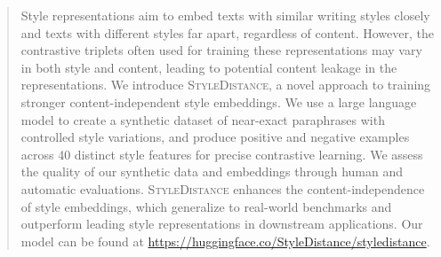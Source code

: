 \begin{abstract}
Style representations aim to embed texts with similar writing styles closely and texts with different styles far apart, regardless of content. However, the contrastive triplets often used for training these representations may vary in both style and content, leading to potential content leakage in the representations. We introduce \textsc{StyleDistance}, a novel approach to training stronger content-independent style embeddings. We use a large language model to create a synthetic dataset of near-exact paraphrases with controlled style variations, and produce positive and negative examples across 40 distinct style features for precise contrastive learning. We assess the quality of our synthetic data and embeddings through human and automatic evaluations.  \textsc{StyleDistance} enhances the content-independence of style embeddings, which generalize to real-world benchmarks and outperform leading style representations in downstream applications. Our model can be found at \url{https://huggingface.co/StyleDistance/styledistance}.
\end{abstract}
\mainfig



